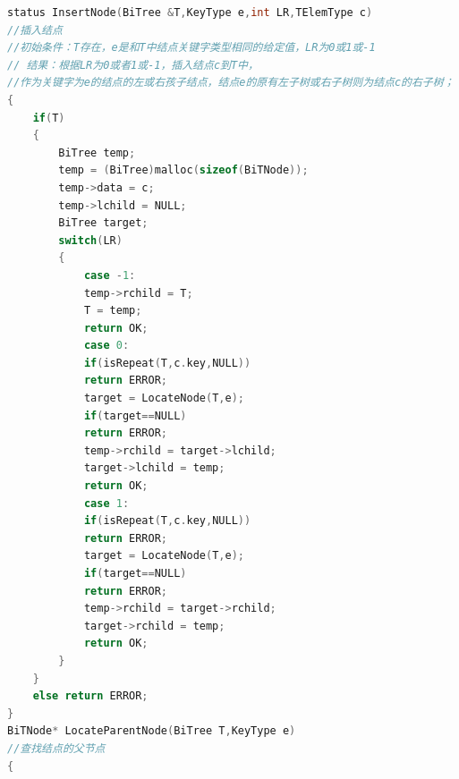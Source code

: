 \documentclass[supercite]{Experimental_Report}
\theoremstyle{definition}
\begin{document}
\begin{lstlisting}[language=C]
status InsertNode(BiTree &T,KeyType e,int LR,TElemType c)
//插入结点
//初始条件：T存在，e是和T中结点关键字类型相同的给定值，LR为0或1或-1 
// 结果：根据LR为0或者1或-1，插入结点c到T中，
//作为关键字为e的结点的左或右孩子结点，结点e的原有左子树或右子树则为结点c的右子树； 
{
	if(T)
	{
		BiTree temp;
		temp = (BiTree)malloc(sizeof(BiTNode));
		temp->data = c;
		temp->lchild = NULL;
		BiTree target;
		switch(LR) 
		{
			case -1:
			temp->rchild = T;
			T = temp;
			return OK;
			case 0:
			if(isRepeat(T,c.key,NULL))
			return ERROR;
			target = LocateNode(T,e);
			if(target==NULL)
			return ERROR;
			temp->rchild = target->lchild;
			target->lchild = temp;
			return OK;
			case 1:
			if(isRepeat(T,c.key,NULL))
			return ERROR;
			target = LocateNode(T,e);
			if(target==NULL)
			return ERROR;
			temp->rchild = target->rchild;
			target->rchild = temp;
			return OK;
		}
	}
	else return ERROR;
}
BiTNode* LocateParentNode(BiTree T,KeyType e)
//查找结点的父节点 
{
	

\end{lstlisting}
\end{document}
